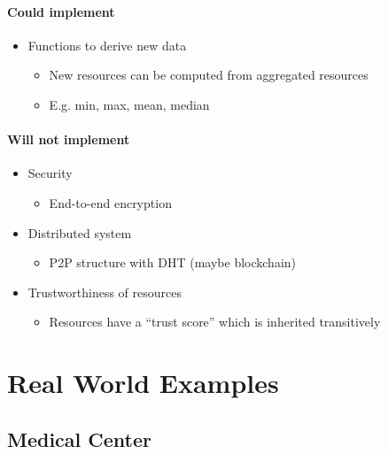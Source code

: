 \paragraph{Could implement}
\begin{itemize}
    \item Functions to derive new data
    \begin{itemize}
        \item New resources can be computed from aggregated resources
        \item E.g. min, max, mean, median
    \end{itemize}
\end{itemize}

\paragraph{Will not implement}
\begin{itemize}
    \item Security
    \begin{itemize}
        \item End-to-end encryption
    \end{itemize}
    \item Distributed system
    \begin{itemize}
        \item P2P structure with DHT (maybe blockchain)
    \end{itemize}
    \item Trustworthiness of resources
    \begin{itemize}
        \item Resources have a “trust score” which is inherited transitively
    \end{itemize}
\end{itemize}

\section{Real World Examples}
\subsection{Medical Center}


